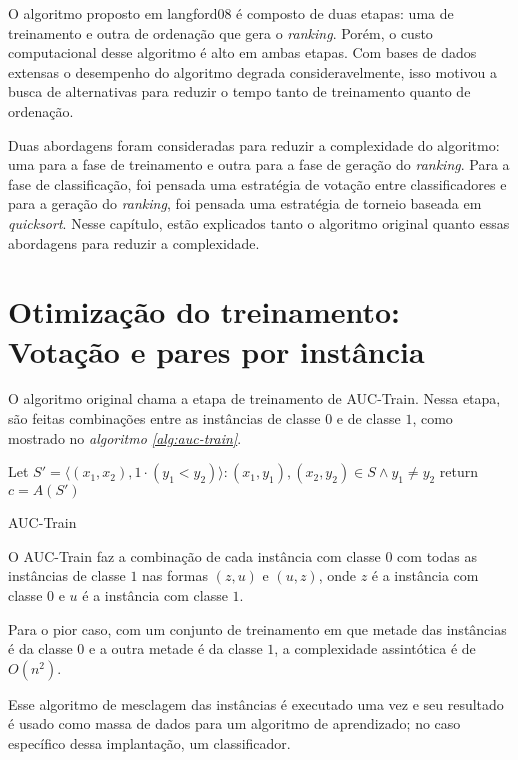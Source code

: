 O algoritmo proposto em {{langford08}} é composto de duas etapas: uma de treinamento e outra de ordenação que gera o \emph{ranking}. Porém, o custo computacional desse algoritmo é alto em ambas etapas. Com bases de dados extensas o desempenho do algoritmo degrada consideravelmente, isso motivou a busca de alternativas para reduzir o tempo tanto de treinamento quanto de ordenação.

Duas abordagens foram consideradas para reduzir a complexidade do algoritmo: uma para a fase de treinamento e outra para a fase de geração do \emph{ranking}. Para a fase de classificação, foi pensada uma estratégia de votação entre classificadores e para a geração do \emph{ranking}, foi pensada uma estratégia de torneio baseada em \emph{quicksort}. Nesse capítulo, estão explicados tanto o algoritmo original quanto essas abordagens para reduzir a complexidade.

\section{Otimização do treinamento: Votação e pares por instância}
O algoritmo original chama a etapa de treinamento de AUC-Train. Nessa etapa, são feitas combinações entre as instâncias de classe $0$ e de classe $1$, como mostrado no \emph{algoritmo \ref{alg:auc-train}}.

\begin{algorithm}
\begin{algorithmic}

\STATE Let $S' = {\langle(x_1, x_2), 1\cdot(y_1 < y_2)\rangle :(x_1, y_1), (x_2, y_2) \in S \wedge y_1 \neq y_2}$
\STATE return $c = A(S')$

\caption{AUC-Train}
\label{alg:auc-train}

\end{algorithmic}
\end{algorithm}

O AUC-Train faz a combinação de cada instância com classe $0$ com todas as instâncias de classe $1$ nas formas $(z, u)$ e $(u, z)$, onde $z$ é a instância com classe $0$ e $u$ é a instância com classe $1$.

Para o pior caso, com um conjunto de treinamento em que metade das instâncias é da classe $0$ e a outra metade é da classe $1$, a complexidade assintótica é de $O(n^2)$.

Esse algoritmo de mesclagem das instâncias é executado uma vez e seu resultado é usado como massa de dados para um algoritmo de aprendizado; no caso específico dessa implantação, um classificador.

